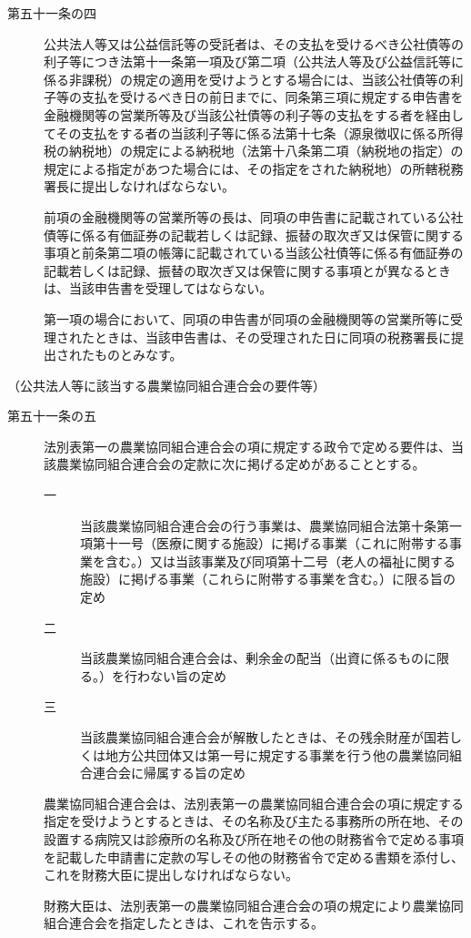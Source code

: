 \documentclass[twocolumn,a4j,10pt]{ltjtarticle}
\begin{document}
\begin{description}
\item[第五十一条の四]公共法人等又は公益信託等の受託者は、その支払を受けるべき公社債等の利子等につき法第十一条第一項及び第二項（公共法人等及び公益信託等に係る非課税）の規定の適用を受けようとする場合には、当該公社債等の利子等の支払を受けるべき日の前日までに、同条第三項に規定する申告書を金融機関等の営業所等及び当該公社債等の利子等の支払をする者を経由してその支払をする者の当該利子等に係る法第十七条（源泉徴収に係る所得税の納税地）の規定による納税地（法第十八条第二項（納税地の指定）の規定による指定があつた場合には、その指定をされた納税地）の所轄税務署長に提出しなければならない。
\item[]前項の金融機関等の営業所等の長は、同項の申告書に記載されている公社債等に係る有価証券の記載若しくは記録、振替の取次ぎ又は保管に関する事項と前条第二項の帳簿に記載されている当該公社債等に係る有価証券の記載若しくは記録、振替の取次ぎ又は保管に関する事項とが異なるときは、当該申告書を受理してはならない。
\item[]第一項の場合において、同項の申告書が同項の金融機関等の営業所等に受理されたときは、当該申告書は、その受理された日に同項の税務署長に提出されたものとみなす。
\end{description}
\noindent\hspace{10pt}（公共法人等に該当する農業協同組合連合会の要件等）
\begin{description}
\item[第五十一条の五]法別表第一の農業協同組合連合会の項に規定する政令で定める要件は、当該農業協同組合連合会の定款に次に掲げる定めがあることとする。
\begin{description}
\item[一]当該農業協同組合連合会の行う事業は、農業協同組合法第十条第一項第十一号（医療に関する施設）に掲げる事業（これに附帯する事業を含む。）又は当該事業及び同項第十二号（老人の福祉に関する施設）に掲げる事業（これらに附帯する事業を含む。）に限る旨の定め
\item[二]当該農業協同組合連合会は、剰余金の配当（出資に係るものに限る。）を行わない旨の定め
\item[三]当該農業協同組合連合会が解散したときは、その残余財産が国若しくは地方公共団体又は第一号に規定する事業を行う他の農業協同組合連合会に帰属する旨の定め
\end{description}
\item[]農業協同組合連合会は、法別表第一の農業協同組合連合会の項に規定する指定を受けようとするときは、その名称及び主たる事務所の所在地、その設置する病院又は診療所の名称及び所在地その他の財務省令で定める事項を記載した申請書に定款の写しその他の財務省令で定める書類を添付し、これを財務大臣に提出しなければならない。
\item[]財務大臣は、法別表第一の農業協同組合連合会の項の規定により農業協同組合連合会を指定したときは、これを告示する。
\end{description}
\end{document}
